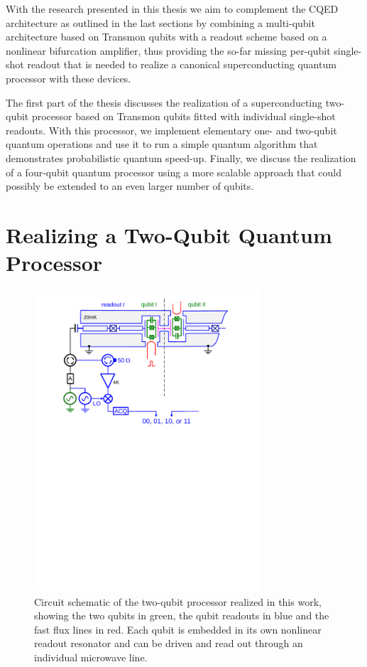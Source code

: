 \smallskip

With the research presented in this thesis we aim  to complement the CQED architecture as outlined in the last sections by combining a multi-qubit architecture based on Transmon qubits with a readout scheme based on a nonlinear bifurcation amplifier, thus providing the so-far missing per-qubit single-shot readout that is needed to realize a canonical superconducting quantum processor with these devices.

The first part of the thesis discusses the realization of a superconducting two-qubit processor based on Transmon qubits fitted with individual single-shot readouts. With this processor, we implement elementary one- and two-qubit quantum operations and use it to run a simple quantum algorithm that demonstrates probabilistic quantum speed-up. Finally, we discuss the realization of a four-qubit quantum processor using a more scalable approach that could possibly be extended to an even larger number of qubits.

\section{Realizing a Two-Qubit Quantum Processor}

\begin{figure}[ht!]
	\centering
		\includegraphics[width=0.75\textwidth]{./material/papers/grover/figures/2_qubit_processor_schematic}
	\caption[Circuit schematic of the realized two-qubit processor]{Circuit schematic of the two-qubit processor realized in this work, showing the two qubits in green, the qubit readouts in blue and the fast flux lines in red. Each qubit is embedded in its own nonlinear readout resonator and can be driven and read out through an individual microwave line.}
	\label{fig:two_qubit_processor_schematic}
\end{figure}

